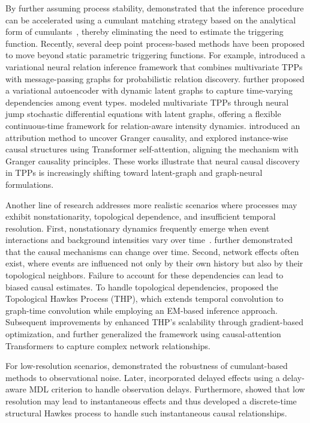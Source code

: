 \documentclass[10pt]{article} %
\begin{document}
By further assuming process stability, \citet{achab2018uncovering} demonstrated that the inference procedure can be accelerated using a cumulant matching strategy based on the analytical form of cumulants~\citep{jovanovic2015cumulants}, thereby eliminating the need to estimate the triggering function.
Recently, several deep point process-based methods have been proposed to move beyond static parametric triggering functions. For example, \citet{zhang2021neural} introduced a variational neural relation inference framework that combines multivariate TPPs with message-passing graphs for probabilistic relation discovery. \citet{yang2024variational} further proposed a variational autoencoder with dynamic latent graphs to capture time-varying dependencies among event types. \citet{wang2025learning} modeled multivariate TPPs through neural jump stochastic differential equations with latent graphs, offering a flexible continuous-time framework for relation-aware intensity dynamics. 
\citet{02817a8a3ee244c68c2a91510915c943} introduced an attribution method to uncover Granger causality, and \citet{wu2024learning} explored instance-wise causal structures using Transformer self-attention, aligning the mechanism with Granger causality principles. 
These works illustrate that neural causal discovery in TPPs is increasingly shifting toward latent-graph and graph-neural formulations. 


Another line of research addresses more realistic scenarios where processes may exhibit nonstationarity, topological dependence, and insufficient temporal resolution.
First, nonstationary dynamics frequently emerge when event interactions and background intensities vary over time~\citep{chen2023detection}. \citet{chen2022learning} further demonstrated that the causal mechanisms can change over time.
Second, network effects often exist, where events are influenced not only by their own history but also by their topological neighbors. Failure to account for these dependencies can lead to biased causal estimates.
To handle topological dependencies, \citet{cai2022thps} proposed the Topological Hawkes Process (THP), which extends temporal convolution to graph-time convolution while employing an EM-based inference approach.
Subsequent improvements by \citet{li2024simple} enhanced THP’s scalability through gradient-based optimization, and \citet{zhu2024causalnet} further generalized the framework using causal-attention Transformers to capture complex network relationships. 

For low-resolution scenarios, \citet{trouleau2021cumulants} demonstrated the robustness of cumulant-based methods to observational noise. Later, \citet{cuppers2024causal} incorporated delayed effects using a delay-aware MDL criterion to handle observation delays. Furthermore, \citet{qiao2023structural} showed that low resolution may lead to instantaneous effects and thus developed a discrete-time structural Hawkes process to handle such instantaneous causal relationships. 
\end{document}
